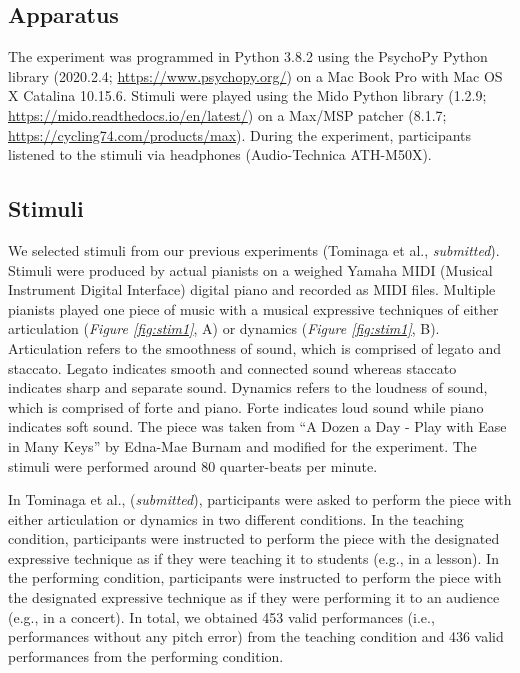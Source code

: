 \documentclass[
  man,floatsintext]{apa6}
\begin{document}
\hypertarget{apparatus}{%
\subsection{Apparatus}\label{apparatus}}

The experiment was programmed in Python 3.8.2 using the PsychoPy Python library (2020.2.4; \url{https://www.psychopy.org/}) on a Mac Book Pro with Mac OS X Catalina 10.15.6. Stimuli were played using the Mido Python library (1.2.9; \url{https://mido.readthedocs.io/en/latest/}) on a Max/MSP patcher (8.1.7; \url{https://cycling74.com/products/max}). During the experiment, participants listened to the stimuli via headphones (Audio-Technica ATH-M50X).

\hypertarget{stimuli}{%
\subsection{Stimuli}\label{stimuli}}

We selected stimuli from our previous experiments (Tominaga et al., \emph{submitted}). Stimuli were produced by actual pianists on a weighed Yamaha MIDI (Musical Instrument Digital Interface) digital piano and recorded as MIDI files. Multiple pianists played one piece of music with a musical expressive techniques of either articulation (\emph{Figure \ref{fig:stim1}}, A) or dynamics (\emph{Figure \ref{fig:stim1}}, B). Articulation refers to the smoothness of sound, which is comprised of legato and staccato. Legato indicates smooth and connected sound whereas staccato indicates sharp and separate sound. Dynamics refers to the loudness of sound, which is comprised of forte and piano. Forte indicates loud sound while piano indicates soft sound. The piece was taken from ``A Dozen a Day - Play with Ease in Many Keys'' by Edna-Mae Burnam and modified for the experiment. The stimuli were performed around 80 quarter-beats per minute.

In Tominaga et al., (\emph{submitted}), participants were asked to perform the piece with either articulation or dynamics in two different conditions. In the teaching condition, participants were instructed to perform the piece with the designated expressive technique as if they were teaching it to students (e.g., in a lesson). In the performing condition, participants were instructed to perform the piece with the designated expressive technique as if they were performing it to an audience (e.g., in a concert). In total, we obtained 453 valid performances (i.e., performances without any pitch error) from the teaching condition and 436 valid performances from the performing condition.
\end{document}
